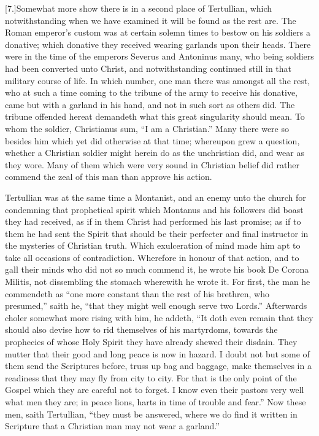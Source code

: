 [7.]Somewhat more show there is in a second place of Tertullian, which notwithstanding when we have examined it  will be found as the rest are. The Roman emperor’s custom was at certain solemn times to bestow on his soldiers a donative; which donative they received wearing garlands upon their heads. There were in the time of the emperors Severus and Antoninus many, who being soldiers had been converted unto Christ, and notwithstanding continued still in that military course of life. In which number, one man there was amongst all the rest, who at such a time coming to the tribune of the army to receive his donative, came but with a garland in his hand, and not in such sort as others did. The tribune offended hereat demandeth what this great singularity should mean. To whom the soldier, Christianus sum, “I am a Christian.” Many there were so besides him which yet did otherwise at that time; whereupon grew a question, whether a Christian soldier might herein do as the unchristian did, and wear as they wore. Many of them which were very sound in Christian belief did rather commend the zeal of this man than approve his action.

Tertullian was at the same time a Montanist, and an enemy unto the church for condemning that prophetical spirit which Montanus and his followers did boast they had received, as if in them Christ had performed his last promise; as if to them he had sent the Spirit that should be their perfecter and final instructor in the mysteries of Christian truth. Which exulceration of mind made him apt to take all occasions of contradiction. Wherefore in honour of that action, and to gall their minds who did not so much commend it, he wrote his book De Corona Militis, not dissembling the stomach wherewith  he wrote it. For first, the man he commendeth as “one more constant than the rest of his brethren, who presumed,” saith he, “that they might well enough serve two Lords.” Afterwards choler somewhat more rising with him, he addeth, “It doth even remain that they should also devise how to rid themselves of his martyrdoms, towards the prophecies of whose Holy Spirit they have already shewed their disdain. They mutter that their good and long peace is now in hazard. I doubt not but some of them send the Scriptures before, truss up bag and baggage, make themselves in a readiness that they may fly from city to city. For that is the only point of the Gospel which they are careful not to forget. I know even their pastors very well what men they are; in peace lions, harts in time of trouble and fear.” Now these men, saith Tertullian, “they must be answered, where we do find it written in Scripture that a Christian man may not wear a garland.”

